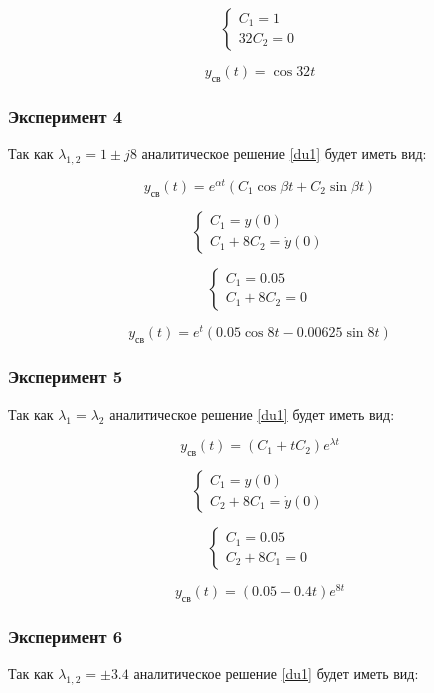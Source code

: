 \documentclass[a5paper, 10pt]{article}
\theoremstyle{definition}
\theoremstyle{plain}
\theoremstyle{remark}
\begin{document}
$$
\begin{cases}
    C_1=1\\
    32C_2=0
\end{cases}
$$

$$
y_{\text{св}}(t) =  \cos 32t
$$

\subsubsection*{Эксперимент 4}

Так как $\lambda_{1,2}=1\pm j8$ аналитическое решение \ref{du1} будет иметь вид:

$$
y_{\text{св}}(t) = e^{\alpha t} \left( C_1 \cos \beta t + C_2 \sin \beta t \right)
$$

$$
\begin{cases}
    C_1=y(0)\\
    C_1+8C_2=\dot{y}(0)
\end{cases}
$$

$$
\begin{cases}
    C_1=0.05\\
    C_1+8C_2=0
\end{cases}
$$

$$
y_{\text{св}}(t) = e^{t} \left( 0.05 \cos 8 t - 0.00625 \sin 8 t \right)
$$

\subsubsection*{Эксперимент 5}

Так как $\lambda_1=\lambda_2$ аналитическое решение \ref{du1} будет иметь вид:

$$y_{\text{св}}(t)=(C_1+tC_2)e^{\lambda t}$$

$$
\begin{cases}
    C_1=y(0)\\
    C_2+8C_1=\dot{y}(0)
\end{cases}
$$

$$
\begin{cases}
    C_1=0.05\\
    C_2+8C_1=0
\end{cases}
$$

$$y_{\text{св}}(t)=(0.05-0.4t)e^{8 t}$$

\subsubsection*{Эксперимент 6}

Так как $\lambda_{1,2}=\pm 3.4$ аналитическое решение \ref{du1} будет иметь вид:
\end{document}
